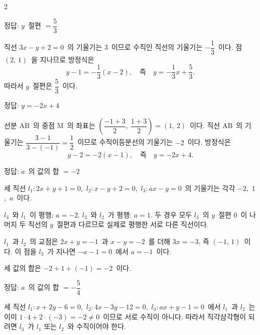 \documentclass[10pt,fleqn]{article}
\begin{document}
\begin{multicols*}{2}
\begin{dmanswerbox}
정답: $y$\ 절편 $= \dfrac{5}{3}$
\end{dmanswerbox}

직선 $3x - y + 2 = 0$\ 의 기울기는 $3$\ 이므로 수직인 직선의 기울기는 $-\dfrac{1}{3}$\ 이다. 점 $(2,\, 1)$\ 을 지나므로 방정식은
\[ y - 1 = -\dfrac{1}{3}(x - 2),\quad \text{즉}\quad y = -\dfrac{1}{3}x + \dfrac{5}{3}. \]
따라서 $y$\ 절편은 $\dfrac{5}{3}$\ 이다.

\begin{dmanswerbox}
정답: $y=-2x+4$
\end{dmanswerbox}

선분 $\overline{\mathrm{AB}}$\ 의 중점 $\mathrm{M}$\ 의 좌표는 $\left( \dfrac{-1+3}{2},\ \dfrac{1+3}{2} \right) = (1,\, 2)$\ 이다. 직선 $\mathrm{AB}$\ 의 기울기는 $\dfrac{3-1}{3-(-1)} = \dfrac{1}{2}$\ 이므로 수직이등분선의 기울기는 $-2$\ 이다. 방정식은
\[ y - 2 = -2(x - 1),\quad \text{즉}\quad y = -2x + 4. \]

\begin{dmanswerbox}
정답: $a$\ 의 값의 합 $= -2$
\end{dmanswerbox}

세 직선 $l_1 : 2x + y + 1 = 0$,\ $l_2 : x - y + 2 = 0$,\ $l_3 : ax - y = 0$\ 의 기울기는 각각 $-2$,\ $1$,\ $a$\ 이다.

 $l_3$\ 와 $l_1$\ 이 평행: $a = -2$. $l_3$\ 와 $l_2$\ 가 평행: $a = 1$. 두 경우 모두 $l_3$\ 의 $y$\ 절편 $0$\ 이 나머지 두 직선의 $y$\ 절편과 다르므로 실제로 평행한 서로 다른 직선이다.

 $l_1$\ 과 $l_2$\ 의 교점은 $2x + y = -1$\ 과 $x - y = -2$\ 를 더해 $3x = -3$, 즉 $(-1,\, 1)$\ 이다. 이 점을 $l_3$\ 가 지나면 $-a - 1 = 0$\ 에서 $a = -1$\ 이다.

세 값의 합은 $-2 + 1 + (-1) = -2$\ 이다.

\begin{dmanswerbox}
정답: $a$\ 의 값의 합 $= -\dfrac{5}{4}$
\end{dmanswerbox}

세 직선 $l_1 : x + 2y - 6 = 0$,\ $l_2 : 4x - 3y - 12 = 0$,\ $l_3 : ax + y - 1 = 0$\ 에서 $l_1$\ 과 $l_2$\ 는 이미 $1 \cdot 4 + 2 \cdot (-3) = -2 \ne 0$\ 이므로 서로 수직이 아니다. 따라서 직각삼각형이 되려면 $l_3$\ 가 $l_1$ 또는 $l_2$\ 와 수직이어야 한다.


\end{multicols*}
\end{document}
